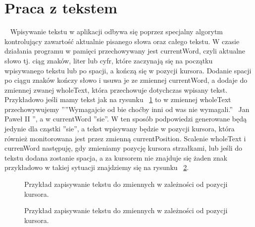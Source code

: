 \documentclass[twoside,a4paper]{book}
\begin{document}
\section{Praca z tekstem}~\label{sec:text}
Wpisywanie tekstu w aplikacji odbywa się poprzez specjalny algorytm kontrolujący zawartość aktualnie pisanego słowa oraz całego tekstu. W czasie działania programu w pamięci przechowywany jest currentWord, czyli aktualne słowo tj. ciąg znaków, liter lub cyfr, które zaczynają się na początku wpisywanego tekstu lub po spacji, a kończą się w pozycji kursora. Dodanie spacji po ciągu znaków kończy słowo i usuwa je ze zmiennej currentWord, a dodaje do zmiennej zwanej wholeText, która przechowuje dotychczas wpisany tekst. Przykładowo jeśli mamy tekst jak na rysunku ~\ref{fig:sentence} to w zmiennej wholeText przechowywujemy ''''Wymagajcie od bie choćby inni od was nie wymagali.'' ~Jan Paweł II '', a w currentWord ''sie''. W ten sposób podpowiedzi generowane będą jedynie dla cząstki ''sie'', a tekst wpisywany będzie w pozycji kursora, która również monitorowana jest przez zmienną currentPosition. Scalenie wholeText i currenWord następuję, gdy zmieniamy pozycję kursora strzałkami, lub jeśli do tekstu dodana zostanie spacja, a za kursorem nie znajduje się żaden znak przykładowo w takiej sytuacji znajdziemy się na rysunku ~\ref{fig:sentence2}. 
\begin{figure}[!h]
		\centering
		\caption{Przykład zapisywanie tekstu do zmiennych w zależności od pozycji kursora.}
		\label{fig:sentence}
\end{figure}
\begin{figure}[!h]
		\centering
		\caption{Przykład zapisywanie tekstu do zmiennych w zależności od pozycji kursora.}
		\label{fig:sentence2}
\end{figure}
\end{document}
